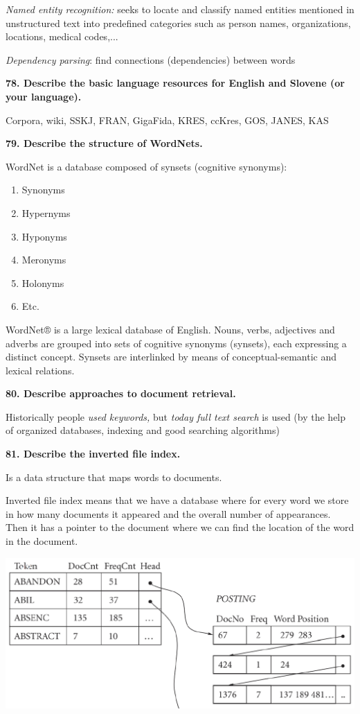 \textit{Named entity recognition:} seeks to locate and classify named
entities mentioned in unstructured text into predefined categories such
as person names, organizations, locations, medical codes,...

\textit{Dependency parsing}: find connections (dependencies) between
words

\textbf{78. Describe the basic language resources for English and
Slovene (or your language).}

Corpora, wiki, SSKJ, FRAN, GigaFida, KRES, ccKres, GOS, JANES, KAS

\textbf{79. Describe the structure of WordNets.}

WordNet is a database composed of synsets (cognitive synonyms):

\begin{enumerate}
\def\labelenumi{\arabic{enumi}.}
\item Synonyms
\item Hypernyms
\item Hyponyms
\item Meronyms
\item Holonyms
\item Etc.
\end{enumerate}

WordNet® is a large lexical database of English. Nouns, verbs,
adjectives and adverbs are grouped into sets of cognitive synonyms
(synsets), each expressing a distinct concept. Synsets are interlinked
by means of conceptual-semantic and lexical relations.

\textbf{80. Describe approaches to document retrieval.}

Historically people \textit{used keywords,} but \textit{today
\emph{full text search}} is used (by the help of organized databases,
indexing and good searching algorithms)

\textbf{81. Describe the inverted file index.}

Is a data structure that maps words to documents.

Inverted file index means that we have a database where for every word
we store in how many documents it appeared and the overall number of
appearances. Then it has a pointer to the document where we can find the
location of the word in the document.

\includegraphics[width=\columnwidth]{media/image10.png}

